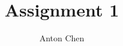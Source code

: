 \title{Assignment 1}
\author{Anton Chen}
\newcommand{\CourseCode}{MATH 418}
\newcommand{\CourseName}{Probability}
\newcommand{\School}{The University of British Columbia}
\newcommand{\Location}{Vancouver, B.C.}
